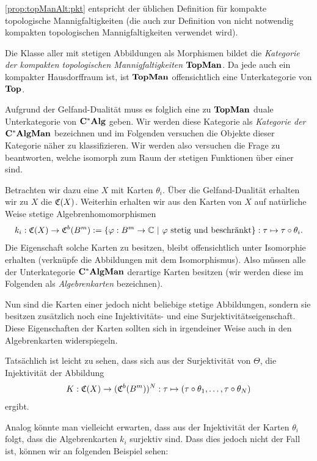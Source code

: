 \begin{bem}
\cref*{prop:topManAlt:pkt} entspricht der üblichen Definition für kompakte topologische Mannigfaltigkeiten (die auch zur Definition von nicht notwendig kompakten topologischen Mannigfaltigkeiten verwendet wird).
\end{bem}

Die Klasse aller \komenTopMan{} mit stetigen Abbildungen als Morphismen bildet die \emph{Kategorie der kompakten topologischen Mannigfaltigkeiten} $\mathbf{TopMan}$. Da jede \komTopMan{} auch ein kompakter Hausdorffraum ist, ist $\mathbf{TopMan}$ offensichtlich eine Unterkategorie von $\mathbf{Top}$. 

Aufgrund der Gelfand-Dualität muss es folglich eine zu $\mathbf{TopMan}$ duale Unterkategorie von $\mathbf{C^*Alg}$ geben. Wir werden diese Kategorie als \emph{Kategorie der \CAlgMann} $\mathbf{C^*AlgMan}$ bezeichnen und im Folgenden versuchen die Objekte dieser Kategorie näher zu klassifizieren. Wir werden also versuchen die Frage zu beantworten, welche \CAlgn{} isomorph zum Raum der stetigen Funktionen über einer \komenTopMan{} sind.

Betrachten wir dazu eine \komTopMan{} $X$ mit Karten $\theta_i$. Über die Gelfand-Dualität erhalten wir zu $X$ die \CAlg{} $\mathfrak{C}(X)$. Weiterhin erhalten wir aus den Karten von $X$ auf natürliche Weise stetige Algebrenhomomorphismen 
	\[k_i: \mathfrak{C}(X) \to \mathfrak{C}^b(B^m):= \{\varphi: B^m \to \mathbb{C} ~|~ \varphi \text{ stetig und beschränkt}\}: \tau \mapsto \tau \circ\theta_i.\]
Die Eigenschaft solche \glqq Karten\grqq{} zu besitzen, bleibt offensichtlich unter Isomorphie erhalten (verknüpfe die Abbildungen mit dem Isomorphismus). Also müssen alle \CAlgn{} der Unterkategorie $\mathbf{C^*AlgMan}$ derartige \glqq Karten\grqq{} besitzen (wir werden diese im Folgenden als \emph{Algebrenkarten} bezeichnen). 

Nun sind die Karten einer \komTopMan{} jedoch nicht beliebige stetige Abbildungen, sondern sie besitzen zusätzlich noch eine Injektivitäts- und eine Surjektivitätseigenschaft. Diese Eigenschaften der Karten sollten sich in irgendeiner Weise auch in den Algebrenkarten widerspiegeln. 

Tatsächlich ist leicht zu sehen, dass sich aus der Surjektivität von $\Theta$, die Injektivität der Abbildung
	\[K: \mathfrak{C}(X) \to (\mathfrak{C}^b(B^m))^N: \tau \mapsto (\tau\circ\theta_1, \dots, \tau\circ\theta_N)\]
ergibt. 

Analog könnte man vielleicht erwarten, dass aus der Injektivität der Karten $\theta_i$ folgt, dass die Algebrenkarten $k_i$ surjektiv sind. Dass dies jedoch nicht der Fall ist, können wir an folgenden Beispiel sehen:

